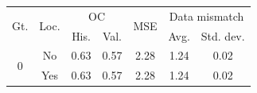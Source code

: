 \begin{tabular}{ccccccc}
\toprule
\multirow{2}{*}{
    Gt.
}
&
\multirow{2}{*}{Loc.} 
& 
\multicolumn{2}{c}{OC} & 
\multirow{2}{*}{
    MSE
} & 
\multicolumn{2}{c}{Data mismatch} 
\\
& & His. & Val. &  & Avg. & Std. dev.
\\
\midrule
\multirow{2}{*}{0} & No & 0.63 & 0.57 & 2.28 & 1.24 & 0.02 \\
 & Yes & 0.63 & 0.57 & 2.28 & 1.24 & 0.02 \\
\bottomrule
\end{tabular}
